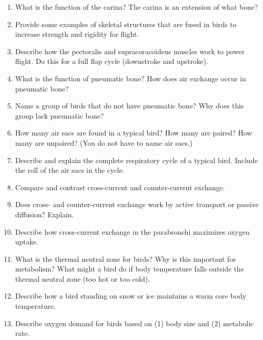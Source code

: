 \documentclass[nofonts, letterpaper]{tufte-handout}
\begin{document}
\begin{enumerate}

\item What is the function of the carina? The carina is an extension of what bone?

\item Provide some examples of skeletal structures that are fused in birds to increase strength and rigidity for flight.

\item Describe how the pectoralis and supracoracoideus muscles work to power flight. Do this for a full flap cycle (downstroke and upstroke).

\item What is the function of pneumatic bone? How does air exchange occur in pneumatic bone? 

\item Name a group of birds that do not have pneumatic bone? Why does this group lack pneumatic bone?

\item How many air sacs are found in a typical bird? How many are paired? How many are unpaired? (You do not have to name air sacs,)

\item Describe and explain the complete respiratory cycle of a typical bird. Include the roll of the air sacs in the cycle.

\item Compare and contrast cross-current and counter-current exchange.

\item Does cross- and counter-current exchange work by active transport or passive diffusion? Explain.

\item Describe how cross-current exchange in the parabronchi maximizes oxygen uptake.

\item What is the thermal neutral zone for birds? Why is this important for metabolism? What might a bird do if body temperature falls outside the thermal neutral zone (too hot or too cold).

\item Describe how a bird standing on snow or ice maintains a warm core body temperature.

\item Describe oxygen demand for birds based on (1) body size and (2) metabolic rate.


\end{enumerate}
\end{document}
